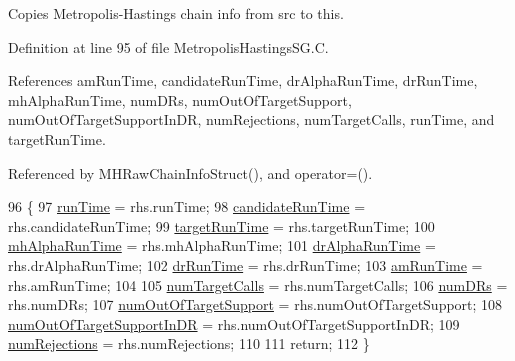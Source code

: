 Copies Metropolis-\/\-Hastings chain info from {\ttfamily src} to {\ttfamily this}. 



Definition at line 95 of file Metropolis\-Hastings\-S\-G.\-C.



References am\-Run\-Time, candidate\-Run\-Time, dr\-Alpha\-Run\-Time, dr\-Run\-Time, mh\-Alpha\-Run\-Time, num\-D\-Rs, num\-Out\-Of\-Target\-Support, num\-Out\-Of\-Target\-Support\-In\-D\-R, num\-Rejections, num\-Target\-Calls, run\-Time, and target\-Run\-Time.



Referenced by M\-H\-Raw\-Chain\-Info\-Struct(), and operator=().


\begin{DoxyCode}
96 \{
97   \hyperlink{struct_q_u_e_s_o_1_1_m_h_raw_chain_info_struct_a5b36b9734f0b40d54cfd4c58c18c9b45}{runTime}          = rhs.runTime;
98   \hyperlink{struct_q_u_e_s_o_1_1_m_h_raw_chain_info_struct_ada3a9649c975062a366df63561c599c7}{candidateRunTime} = rhs.candidateRunTime;
99   \hyperlink{struct_q_u_e_s_o_1_1_m_h_raw_chain_info_struct_ab230db8f99e46f0c1e4fc6c2aa3773eb}{targetRunTime}    = rhs.targetRunTime;
100   \hyperlink{struct_q_u_e_s_o_1_1_m_h_raw_chain_info_struct_a16d5d703c764352dfe30dfaa25ce8b8b}{mhAlphaRunTime}   = rhs.mhAlphaRunTime;
101   \hyperlink{struct_q_u_e_s_o_1_1_m_h_raw_chain_info_struct_afa74a9d74fc3e7942012b8d8448f6687}{drAlphaRunTime}   = rhs.drAlphaRunTime;
102   \hyperlink{struct_q_u_e_s_o_1_1_m_h_raw_chain_info_struct_acd15a61993f122a3780dfae6f096d9b9}{drRunTime}        = rhs.drRunTime;
103   \hyperlink{struct_q_u_e_s_o_1_1_m_h_raw_chain_info_struct_a0ea7cbad553a5f79c1e1c89b25bc8cde}{amRunTime}        = rhs.amRunTime;
104 
105   \hyperlink{struct_q_u_e_s_o_1_1_m_h_raw_chain_info_struct_a506e08bdffc1f777e33c7ec2d7862747}{numTargetCalls}            = rhs.numTargetCalls;
106   \hyperlink{struct_q_u_e_s_o_1_1_m_h_raw_chain_info_struct_a993b070bd796dd176f4168be05f11ce9}{numDRs}                    = rhs.numDRs;
107   \hyperlink{struct_q_u_e_s_o_1_1_m_h_raw_chain_info_struct_a601f798ee4dc28cfa6b342fc04a8c841}{numOutOfTargetSupport}     = rhs.numOutOfTargetSupport;
108   \hyperlink{struct_q_u_e_s_o_1_1_m_h_raw_chain_info_struct_a783bb6c6b6dcab7f2bcc9fd0f49c588f}{numOutOfTargetSupportInDR} = rhs.numOutOfTargetSupportInDR;
109   \hyperlink{struct_q_u_e_s_o_1_1_m_h_raw_chain_info_struct_a276f608de19910713df01124a971c79c}{numRejections}             = rhs.numRejections;
110 
111   \textcolor{keywordflow}{return};
112 \}
\end{DoxyCode}
